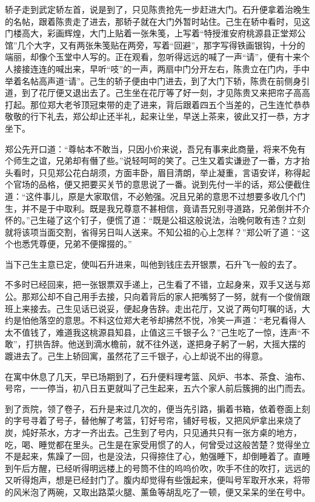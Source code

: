 \documentclass[12pt,UTF8]{ctexbook}
\begin{document}
{{{轿子走到武定轿左首，说是到了，只见陈贵抢先一步赶进大门。石升便拿着治晚生的名帖，跟着陈贵走了进去，那轿子就在大门外暂时站住。己生在轿中看时，见这门楼高大，彩画辉煌，大门上贴着一张朱笺，上写着“特授淮安府桃源县正堂郑公馆”几个大字，又有两张朱笺贴在两旁，写着“回避”，那字写得铁画银钩，十分的端丽，却像个玉堂中人写的。正在观看，忽听得远远的喊了一声“请”，便有十来个人接接连连的喊出来，早听“吱”的一声，两扇中门分开左右，陈贵立在门内，手中举着名帖高声道“请”。己生的轿子便由中门进去，到了大门下轿，陈贵在前侧身引道，到了花厅便又退出去了。己生坐在花厅等了好一刻，才见陈贵又来把帘子高高打起。那位郑大老爷顶冠束带的走了进来，背后跟着四五个当差的，己生连忙恭恭敬敬的行下礼去，郑公却止还半礼，起来让坐，早送上茶来，彼此又打一恭，方才坐下。

郑公先开口道：“尊帖本不敢当，只因小价来说，吾兄有事来此商量，将来不免有个师生之谊，兄弟却有僭了些。”说轻呵呵的笑了。己生又着实谦逊了一番，方才抬头看时，只见郑公花白胡须，方面丰卧，眉目清朗，举止凝重，言语安详，称得起个官场的品格，便又把要买关节的意思说了一番。说到先付一半的话，郑公便截住道：“这件事儿，原是大家取信，不必勉强。况且兄弟的意思不过想要多收几个门生，并不是于中取利。既是我兄尊意不甚相信，竟请吾兄别寻道路，兄弟倒并不介怀的。”己生碰了这个钉子，便慌了道：“既是公祖这般说法，治晚何敢有违？立刻就将该项当面交割，省得另日叫人送来。不知公祖的心上怎样？”郑公听了道：“这个也悉凭尊便，兄弟不便撺掇的。”

当下己生主意已定，使叫石升进来，叫他到钱庄去开银票，石升飞一般的去了。

不多时已经回来，把一张银票双手递上，己生看了不错，立起身来，双手又送与郑公。那郑公却不自己用手去接，只向着背后的家人把嘴努了一努，就有一个俊俏跟班上来接去。己生见话已说妥，便起身告辞。走出花厅，又说了两句叮嘱的话，大约是怕他落空的意思。不料这位郑大老爷却拂然不悦，冷笑一声道：“老兄看得人太不值钱了，难道我这桃源县知县，止值这三千银子么？”己生吃了一惊，连声“不敢”，打拱告辞。他送到滴水檐前，就不往外送，遂把身子躬了一躬，大摇大摆的踱进去了。己生上轿回寓，虽然花了三千银子，心上却说不出的得意。

在寓中休息了几天，早已场期到了，石升便料理考篮、风炉、书本、茶食、油布、号帘，一一停当，初八日五更就叫了己生起来，五六个家人前后簇拥的出门而去。

到了贡院，领了卷子，石升是来过几次的，便当先引路，掮着书箱，依着卷面上刻的字号寻着了号子，替他解了考篮，钉好号帘，铺好号板，又把风炉拿出来烧了炭，炖好茶水，方才一齐出去。己生到了号内，只见通共只有一张方桌的地方，吃，喝、睡觉都在里头。己生是在家受用惯了的人，何曾受过这般苦楚？觉得坐立不是起来，焦躁了一回，也是没法，只得捺住了心，勉强睡下，却倒睡着了。直睡到午后方醒，已经听得明远楼上的号筒不住的呜呜价吹，吹手不住的吹打，远远的又听得炮声，想是已经封门了。腹内却觉得有些饿起来，便叫号军取开水来，将带的风米泡了两碗，又取出路菜火腿、薰鱼等胡乱吃了一顿，便又呆呆的坐在号中。

}}}
\end{document}
